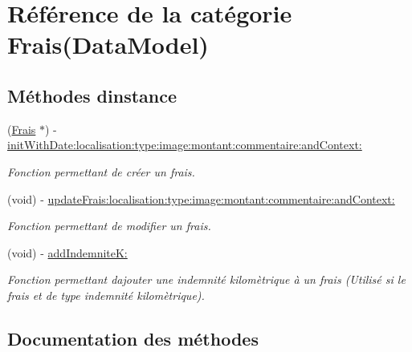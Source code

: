 \hypertarget{category_frais_07_data_model_08}{}\section{Référence de la catégorie Frais(Data\+Model)}
\label{category_frais_07_data_model_08}
\subsection*{Méthodes d\textquotesingle{}instance}
\begin{DoxyCompactItemize}
\item 
(\hyperlink{interface_frais}{Frais} $\ast$) -\/ \hyperlink{category_frais_07_data_model_08_a29457909591bf30736c9c59d835acc50}{init\+With\+Date\+:localisation\+:type\+:image\+:montant\+:commentaire\+:and\+Context\+:}
\begin{DoxyCompactList}\small\item\em Fonction permettant de créer un frais. \end{DoxyCompactList}\item 
(void) -\/ \hyperlink{category_frais_07_data_model_08_ac633bc42fb134ed7386255d789d5dbd0}{update\+Frais\+:localisation\+:type\+:image\+:montant\+:commentaire\+:and\+Context\+:}
\begin{DoxyCompactList}\small\item\em Fonction permettant de modifier un frais. \end{DoxyCompactList}\item 
(void) -\/ \hyperlink{category_frais_07_data_model_08_a167e8a8bc4944d05418814431c8b1928}{add\+Indemnite\+K\+:}
\begin{DoxyCompactList}\small\item\em Fonction permettant d\textquotesingle{}ajouter une indemnité kilomètrique à un frais (Utilisé si le frais et de type indemnité kilomètrique). \end{DoxyCompactList}\end{DoxyCompactItemize}


\subsection{Documentation des méthodes}
\hypertarget{category_frais_07_data_model_08_a167e8a8bc4944d05418814431c8b1928}{}
